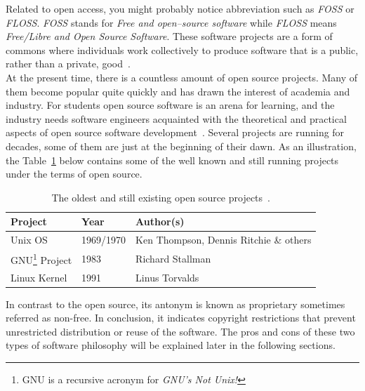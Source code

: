 \documentclass[12pt,a4paper]{article}
\theoremstyle{definition}
\begin{document}
    Related to open access, you might probably notice abbreviation such as \textit{FOSS} or \textit{FLOSS}. \textit{FOSS} stands for \textit{Free and open--source software} while \textit{FLOSS} means \textit{Free/Libre and Open Source Software}. These software projects are a form of commons where individuals work collectively to produce software that is a public, rather than a private, good~\cite{4273082}.\\

    At the present time, there is a countless amount of open source projects. Many of them become popular quite quickly and has drawn the interest of academia and industry. For students open source software is an arena for learning, and the industry needs software engineers acquainted with the theoretical and practical aspects of open source software development~\cite{4273076}. Several projects are running for decades, some of them are just at the beginning of their dawn. As an illustration, the Table~\ref{tab:open-source-projects} below contains some of the well known and still running projects under the terms of open source.\\

    \begin{table}[H]
        \begin{center}
            \begin{tabular}{l|l|l}
                Project      & Year      & Author(s)                              \\
                \hline
                Unix OS      & 1969/1970 & Ken Thompson, Dennis Ritchie \& others \\
                GNU\footnote{GNU is a recursive acronym for \textit{GNU's Not Unix!}} Project
                             & 1983      & Richard Stallman                       \\
                Linux Kernel & 1991      & Linus Torvalds                         \\[-5mm]
            \end{tabular}
        \end{center}
        \caption{The oldest and still existing open source projects~\cite{SD:linux-kernel, WP:gnu-proj-init, DLACM:history-of-unix}.}
        \label{tab:open-source-projects}
    \end{table}

    In contrast to the open source, its antonym is known as proprietary sometimes referred as non-free. In conclusion, it indicates copyright restrictions that prevent unrestricted distribution or reuse of the software. The pros and cons of these two types of software philosophy will be explained later in the following sections.
\end{document}
